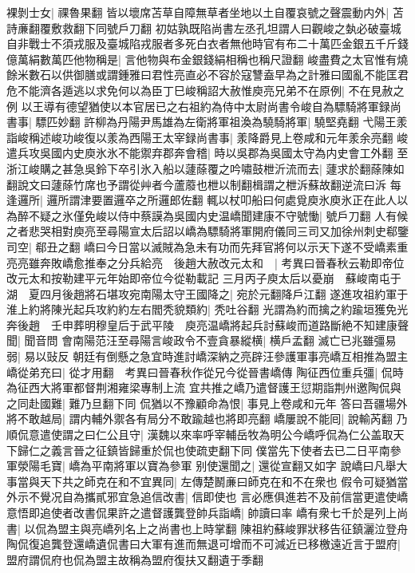 裸剝士女|{
	祼魯果翻}
皆以壞席苫草自障無草者坐地以土自覆哀號之聲震動内外|{
	苫詩亷翻覆敷救翻下同號戶刀翻}
初姑孰既陷尚書左丞孔坦謂人曰觀峻之埶必破臺城自非戰士不須戎服及臺城陷戎服者多死白衣者無他時官有布二十萬匹金銀五千斤錢億萬絹數萬匹他物稱是|{
	言他物與布金銀錢絹相稱也稱尺證翻}
峻盡費之太官惟有燒餘米數石以供御膳或謂鍾雅曰君性亮直必不容於寇讐盍早為之計雅曰國亂不能匡君危不能濟各遁逃以求免何以為臣丁巳峻稱詔大赦惟庾亮兄弟不在原例|{
	不在見赦之例}
以王導有德望猶使以本官居已之右祖約為侍中太尉尚書令峻自為驃騎將軍録尚書事|{
	驃匹妙翻}
許柳為丹陽尹馬雄為左衛將軍祖渙為驍騎將軍|{
	驍堅堯翻}
弋陽王羕詣峻稱述峻功峻復以羕為西陽王太宰録尚書事|{
	羕降爵見上卷咸和元年羕余亮翻}
峻遣兵攻吳國内史庾氷氷不能禦弃郡奔會稽|{
	時以吳郡為吳國太守為内史會工外翻}
至浙江峻購之甚急吳鈴下卒引氷入船以蘧蒢覆之吟嘯鼓枻沂流而去|{
	蘧求於翻蒢陳如翻說文曰蘧蒢竹席也予謂從艸者今蘆䕠也枻以制翻楫謂之枻泝蘇故翻逆流曰泝}
每逢邏所|{
	邏所謂津要置邏卒之所邏郎佐翻}
輒以杖叩船曰何處覓庾氷庾氷正在此人以為醉不疑之氷僅免峻以侍中蔡謨為吳國内史温嶠聞建康不守號慟|{
	號戶刀翻}
人有候之者悲哭相對庾亮至尋陽宣太后詔以嶠為驃騎將軍開府儀同三司又加徐州刺史郗鑒司空|{
	郗丑之翻}
嶠曰今日當以滅賊為急未有功而先拜官將何以示天下遂不受嶠素重亮亮雖奔敗嶠愈推奉之分兵給亮　後趙大赦改元太和　|{
	考異曰晉春秋云勒即帝位改元太和按勒建平元年始即帝位今從勒載記}
三月丙子庾太后以憂崩　蘇峻南屯于湖　夏四月後趙將石堪攻宛南陽太守王國降之|{
	宛於元翻降戶江翻}
遂進攻祖約軍于淮上約將陳光起兵攻約約左右閻秃貌類約|{
	秃吐谷翻}
光謂為約而擒之約踰垣獲免光奔後趙　壬申葬明穆皇后于武平陵　庾亮温嶠將起兵討蘇峻而道路斷絶不知建康聲聞|{
	聞音問}
會南陽范汪至尋陽言峻政令不壹貪暴縱横|{
	横戶孟翻}
滅亡已兆雖彊易弱|{
	易以䜴反}
朝廷有倒懸之急宜時進討嶠深納之亮辟汪參護軍事亮嶠互相推為盟主嶠從弟充曰|{
	從才用翻　考異曰晉春秋作從兄今從晉書嶠傳}
陶征西位重兵彊|{
	侃時為征西大將軍都督荆湘雍梁專制上流}
宜共推之嶠乃遣督護王愆期詣荆州邀陶侃與之同赴國難|{
	難乃旦翻下同}
侃猶以不豫顧命為恨|{
	事見上卷咸和元年}
答曰吾疆場外將不敢越局|{
	謂内輔外禦各有局分不敢踰越也將即亮翻}
嶠屢說不能囘|{
	說輸芮翻}
乃順侃意遣使謂之曰仁公且守|{
	漢魏以來率呼宰輔岳牧為明公今嶠呼侃為仁公盖取天下歸仁之義言晉之征鎮皆歸重於侃也使疏吏翻下同}
僕當先下使者去已二日平南參軍滎陽毛寶|{
	嶠為平南將軍以寶為參軍}
别使還聞之|{
	還從宣翻又如字}
說嶠曰凡舉大事當與天下共之師克在和不宜異同|{
	左傳楚鬭亷曰師克在和不在衆也}
假令可疑猶當外示不覺况自為攜貳邪宜急追信改書|{
	信即使也}
言必應俱進若不及前信當更遣使嶠意悟即追使者改書侃果許之遣督護龔登帥兵詣嶠|{
	帥讀曰率}
嶠有衆七千於是列上尚書|{
	以侃為盟主與亮嶠列名上之尚書也上時掌翻}
陳祖約蘇峻罪狀移告征鎮灑泣登舟陶侃復追龔登還嶠遺侃書曰大軍有進而無退可增而不可減近已移檄遠近言于盟府|{
	盟府謂侃府也侃為盟主故稱為盟府復扶又翻遺于季翻}
